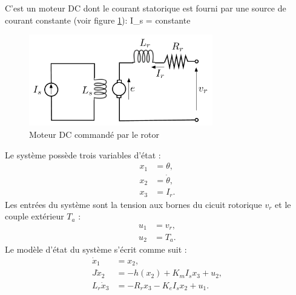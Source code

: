 C'est un moteur DC dont le courant statorique est fourni par une source de
courant constante (voir figure \ref{fig:cominduit}):
\eqnn
I_s = constante
\eeqnn
\begin{figure}[htbp]
\begin{center}
\includegraphics[height=4cm]{cominduit}
\caption{Moteur DC commandé par le rotor}
\label{fig:cominduit}
\end{center}
\end{figure}
Le système possède trois variables d'état :
\begin{equation*} \begin{split}
x_1 &= \theta, \\
x_2 &= \dot{\theta}, \\
x_3 &= I_r. 
\end{split} \end{equation*}
Les entrées du système sont la tension aux bornes du cicuit rotorique
$v_r$ et le couple extérieur $T_a$ : 
\begin{equation*} \begin{split}
u_1 &= v_r, \\
u_2 &= T_a.
\end{split} \end{equation*}
Le modèle d'état du système s'écrit comme suit :
\begin{equation*} \begin{split}
\dot x_1 &= x_2,\\
J\dot x_2 &= -h(x_2) + K_m I_s x_3 + u_2,\\
L_r\dot x_3 &= -R_r x_3 - K_e I_s x_2 + u_1.
\end{split} \end{equation*}
\\

